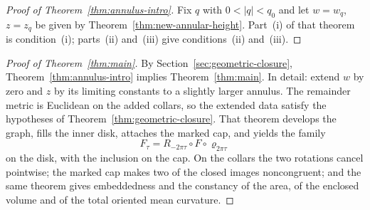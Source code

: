 \begin{proof}[Proof of Theorem~\ref{thm:annulus-intro}]
Fix $q$ with $0<|q|<q_0$ and let $w=w_q$, $z=z_q$ be given by
Theorem~\ref{thm:new-annular-height}. Part~(i) of that theorem is
condition~(i); parts~(ii) and~(iii) give conditions~(ii) and~(iii).
\end{proof}

\begin{proof}[Proof of Theorem~\ref{thm:main}]
By Section~\ref{sec:geometric-closure},
Theorem~\ref{thm:annulus-intro} implies Theorem~\ref{thm:main}. In
detail: extend $w$ by zero and $z$ by its limiting constants to a
slightly larger annulus. The remainder metric is Euclidean on the
added collars, so the extended data satisfy the hypotheses of
Theorem~\ref{thm:geometric-closure}. That theorem develops the graph,
fills the inner disk, attaches the marked cap, and yields the family
\[
 F_\tau=R_{-2\pi\tau}\circ F\circ\varrho_{2\pi\tau}
\]
on the disk, with the inclusion on the cap. On the collars the two
rotations cancel pointwise; the marked cap makes two of the closed
images noncongruent; and the same theorem gives embeddedness and the
constancy of the area, of the enclosed volume and of the total
oriented mean curvature.
\end{proof}
